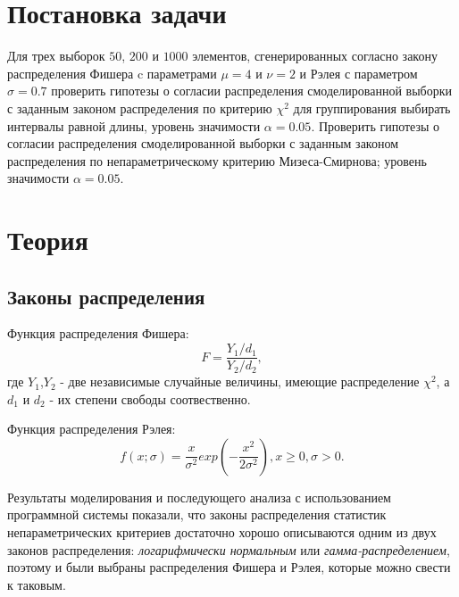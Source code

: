 \documentclass[a4]{article}
\renewcommand{\listoftables}{\begingroup %
\tocsection
\tocfile{\listtablename}{lot}
\endgroup}
\begin{document}
\newpage
\pagestyle{plain}




\newpage
\tableofcontents{}
\newpage
\listoftables{}
\newpage

\section{Постановка задачи}

Для трех выборок $50$, $200$ и $1000$ элементов, сгенерированных согласно закону распределения Фишера c параметрами $\mu = 4$ и $\nu = 2$ и Рэлея с параметром $\sigma = 0.7$ проверить гипотезы о согласии распределения смоделированной выборки с заданным законом распределения по критерию $\chi^2$ для группирования выбирать интервалы равной длины, уровень значимости $\alpha = 0.05$. Проверить гипотезы о согласии распределения смоделированной выборки с заданным законом распределения по непараметрическому критерию Мизеса-Смирнова; уровень значимости $\alpha = 0.05$. 

\section{Теория}
\subsection{Законы распределения}
Функция распределения Фишера:
\begin{equation}
    F = \frac{Y_{1}/d_{1} }{Y_{2}/d_{2}},
\end{equation}
 где $Y_{1}$,$ Y_{2}$ - две независимые случайные величины, имеющие распределение $\chi^2$, а $d_{1}$ и $d_{2}$ - их степени свободы соотвественно.

Функция распределения Рэлея:
\begin{equation}
    f(x;\sigma) = \frac{x} {\sigma^2}exp\left(-\frac{x^2}{2\sigma^2}\right), x \geqslant 0, \sigma > 0.
\end{equation}

Результаты моделирования  и последующего  анализа  с использованием  программной системы \cite{8_4} показали,  что  законы распределения  статистик  непараметрических  критериев достаточно  хорошо  описываются  одним  из  двух  законов  распределения:  \textit{логарифмически нормальным} или \textit{ гамма-распределением}, поэтому и были выбраны распределения Фишера и Рэлея, которые можно свести к таковым.
\end{document}
